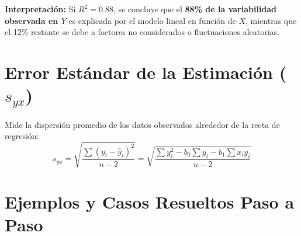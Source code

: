\textbf{Interpretación:} Si $R^2 = 0.88$, se concluye que el \textbf{88\% de la variabilidad observada en $Y$} es explicada por el modelo lineal en función de $X$, mientras que el 12\% restante se debe a factores no considerados o fluctuaciones aleatorias.

\section{Error Estándar de la Estimación ($s_{yx}$)}
Mide la dispersión promedio de los datos observados alrededor de la recta de regresión:
\begin{equation}
    s_{yx} = \sqrt{\frac{\sum (y_i - \hat{y}_i)^2}{n - 2}} = \sqrt{\frac{\sum y_i^2 - b_0 \sum y_i - b_1 \sum x_i y_i}{n - 2}}
\end{equation}

\section{Ejemplos y Casos Resueltos Paso a Paso}

